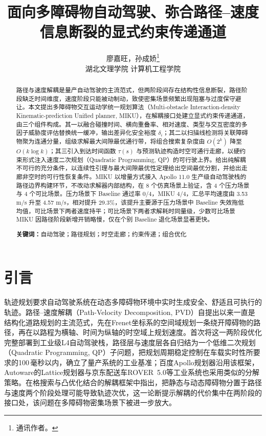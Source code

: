 \documentclass[a4paper,zihao=5]{ctexart}
\title{面向多障碍物自动驾驶、弥合路径--速度信息断裂的显式约束传递通道}
\author{廖嘉旺，孙成娇\thanks{通讯作者。}\\[2pt]\normalsize 湖北文理学院 计算机工程学院}
\date{}
\theoremstyle{definition}
\begin{document}
\maketitle

\begin{abstract}
\small
\noindent
路径与速度解耦是量产自动驾驶的主流范式，但两阶段间存在结构性信息断裂，路径阶段缺乏时间维度，速度阶段只能被动制动，致使密集场景频繁出现阻塞与过度保守避让。本文提出多障碍物交互运动学统一规划算法（Multi-obstacle Interaction-density Kinematic-prediction Unified planner, MIKU），在解耦接口处建立显式约束传递通道，由三个组件构成。其一以融合碰撞时间、横向重叠率、相对速度、类型与交互密度的多因子威胁度评估替换统一缓冲，输出差异化安全裕度 $\delta_i$；其二以扫描线检测将关联障碍物聚为连通分量，组级求解最大间隙最优通行带，将组合搜索复杂度由 $O(2^k)$ 降至 $O(k\log k)$；其三引入到达时间函数 $\tau(s)$ 与预测轨迹构造时空可通行走廊，以硬约束形式注入速度二次规划（Quadratic Programming, QP）的可行驶上界。给出纯解耦不可行的充分条件，以连续性引理与最大间隙最优性定理给出空间最优分割，并给出走廊非空时的可行性恢复条件。MIKU 以增量方式接入 Apollo 11.0 生产级自动驾驶栈的路径边界构建环节，不改动求解器内部结构，在 8 个仿真场景上验证，含 4 个压力场景与 4 个可比场景。压力场景下 Baseline 通过率 0/4，MIKU 4/4，汇总平均速度由 3.53 m/s 升至 4.57 m/s，相对提升 29.3\%，该提升主要源于压力场景中 Baseline 失效拖低均值，可比场景下两者速度持平；可比场景下两者求解耗时同量级，少数可比场景 MIKU 因路径阶段新增开销略慢，仅在个别 Baseline 退化场景显著更快。

\vspace{0.5em}
\noindent\textbf{关键词：}自动驾驶；路径规划；时空走廊；约束传递；组合优化
\end{abstract}
\section{引言}
\label{sec:intro}

轨迹规划要求自动驾驶系统在动态多障碍物环境中实时生成安全、舒适且可执行的轨迹。路径--速度解耦（Path-Velocity Decomposition, PVD）自\citet{kant1986pvd}提出以来一直是结构化道路规划的主流范式，先在Frenet坐标系的空间域规划一条绕开障碍物的路径，再在以路程为横轴、时间为纵轴的时空域上规划速度。\citet{fan2018baidu}首次将这一两阶段优化完整部署到工业级L4自动驾驶栈，路径层与速度层各自归结为一个低维二次规划（Quadratic Programming, QP）子问题，把规划周期稳定控制在车载实时性所要求的100\,毫秒以内，确立了量产系统的工业基准；百度Apollo规划器\citep{apollo2024}沿用该框架，Autoware的Lattice规划器与京东配送车ROVER~5.0\citep{wang2022_jfr}等工业系统也采用类似的分解策略。\citet{meng2019_access}在格搜索与凸优化结合的解耦框架中指出，把静态与动态障碍物分置于路径与速度两个阶段处理可能导致轨迹次优，这一论断提示解耦的代价集中在两阶段的接口处，该问题在多障碍物密集场景下被进一步放大\citep{gonzalez2016}。
\end{document}
